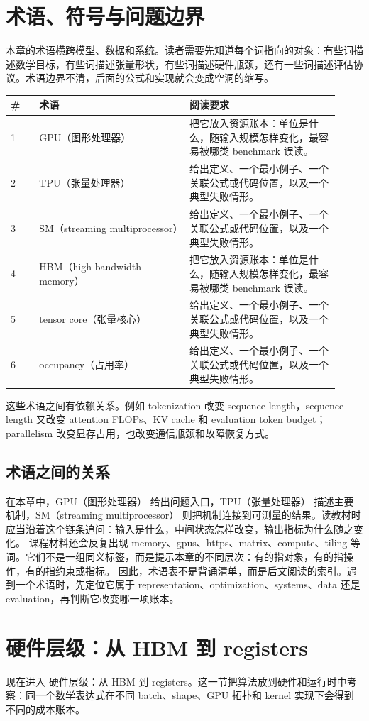 \documentclass[a4paper]{article}
\begin{document}
\section{术语、符号与问题边界}
本章的术语横跨模型、数据和系统。读者需要先知道每个词指向的对象：有些词描述数学目标，有些词描述张量形状，有些词描述硬件瓶颈，还有一些词描述评估协议。术语边界不清，后面的公式和实现就会变成空洞的缩写。
\begin{longtable}{p{0.08\linewidth}p{0.42\linewidth}p{0.42\linewidth}}
\toprule
\textbf{\#} & \textbf{术语} & \textbf{阅读要求}\\
\midrule
1 & GPU（图形处理器） & 把它放入资源账本：单位是什么，随输入规模怎样变化，最容易被哪类 benchmark 误读。\\
2 & TPU（张量处理器） & 给出定义、一个最小例子、一个关联公式或代码位置，以及一个典型失败情形。\\
3 & SM（streaming multiprocessor） & 给出定义、一个最小例子、一个关联公式或代码位置，以及一个典型失败情形。\\
4 & HBM（high-bandwidth memory） & 把它放入资源账本：单位是什么，随输入规模怎样变化，最容易被哪类 benchmark 误读。\\
5 & tensor core（张量核心） & 给出定义、一个最小例子、一个关联公式或代码位置，以及一个典型失败情形。\\
6 & occupancy（占用率） & 给出定义、一个最小例子、一个关联公式或代码位置，以及一个典型失败情形。\\
\bottomrule
\end{longtable}
这些术语之间有依赖关系。例如 tokenization 改变 sequence length，sequence length 又改变 attention FLOPs、KV cache 和 evaluation token budget；parallelism 改变显存占用，也改变通信瓶颈和故障恢复方式。
\subsection{术语之间的关系}
在本章中，GPU（图形处理器） 给出问题入口，TPU（张量处理器） 描述主要机制，SM（streaming multiprocessor） 则把机制连接到可测量的结果。读教材时应当沿着这个链条追问：输入是什么，中间状态怎样改变，输出指标为什么随之变化。
课程材料还会反复出现 memory、gpus、https、matrix、compute、tiling 等词。它们不是一组同义标签，而是提示本章的不同层次：有的指对象，有的指操作，有的指约束或指标。
因此，术语表不是背诵清单，而是后文阅读的索引。遇到一个术语时，先定位它属于 representation、optimization、systems、data 还是 evaluation，再判断它改变哪一项账本。
\section{硬件层级：从 HBM 到 registers}
现在进入 硬件层级：从 HBM 到 registers。这一节把算法放到硬件和运行时中考察：同一个数学表达式在不同 batch、shape、GPU 拓扑和 kernel 实现下会得到不同的成本账本。
\end{document}

